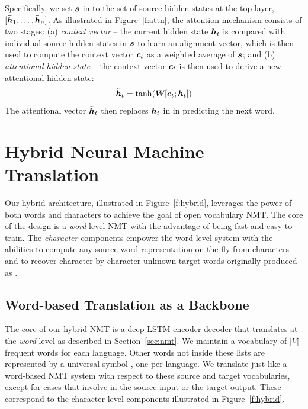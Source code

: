 Specifically, we set $\mbox{\boldmath{$s$}}$ in  to
the set of source hidden states at the top layer, $[\mbox{\boldmath{$\bar{h}$}}_{1}, \dots, \mbox{\boldmath{$\bar{h}$}}_{n}]$. 
As illustrated in Figure~\ref{f:attn}, the attention mechanism consists of two stages: (a) {\it
context vector} -- the current hidden state $\mbox{\boldmath{$h$}}_{t}$ is compared with
individual source hidden states in $\mbox{\boldmath{$s$}}$ to learn an alignment vector, which
is then used to compute the context vector $\mbox{\boldmath{$c$}}_{t}$ as a weighted average of
$\mbox{\boldmath{$s$}}$; and (b) {\it
attentional hidden state} -- the context vector $\mbox{\boldmath{$c$}}_{t}$ is then used to derive a
new attentional hidden state:
\begin{equation}
\mbox{\boldmath{$\tilde{h}$}}_{t} = \tanh(\bm{W}_{}[\mbox{\boldmath{$c$}}_{t}; \mbox{\boldmath{$h$}}_{t}])
\label{e:hs}
\end{equation} 
The attentional vector $\mbox{\boldmath{$\tilde{h}$}}_{t}$ then replaces $\mbox{\boldmath{$h$}}_{t}$ in  in
predicting the next word.

\section{Hybrid Neural Machine Translation}
\label{sec:hybrid}
Our hybrid architecture, illustrated in Figure~\ref{f:hybrid}, leverages the power of both words
and characters to achieve the goal of open vocabulary NMT. The core of the
design is a {\it word}-level NMT with the advantage of being fast and easy to
train.
The {\it character} components empower the 
word-level system with the abilities to compute any source word representation on the fly from 
characters and to recover character-by-character unknown target words
originally produced as \unk{}.

\subsection{Word-based Translation as a Backbone}
\label{subsec:hybrid_word}

The core of our hybrid NMT is a deep LSTM encoder-decoder that translates at
the {\it word} level as described in Section~\ref{sec:nmt}. We maintain a
vocabulary of $|V|$ frequent words for each language. Other words not inside these
lists are represented by a universal symbol \unk{}, one per language.
We translate just like a word-based NMT system with respect to these source and
target vocabularies, except for cases that involve \unk{} in the source input or 
the target output. These correspond to the character-level components 
illustrated in Figure~\ref{f:hybrid}.

